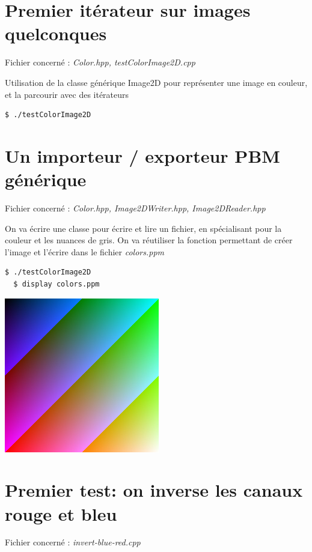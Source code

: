 \documentclass[a4paper,10pt]{article}
\begin{document}
    \section{Premier itérateur sur images quelconques}
    Fichier concerné : \emph{Color.hpp, testColorImage2D.cpp}

     Utilisation de la classe générique Image2D pour représenter une image en couleur, et la parcourir avec des itérateurs
  \begin{lstlisting}[language=Bash]
  $ ./testColorImage2D
  \end{lstlisting}
    \section{Un importeur / exporteur PBM générique}
    Fichier concerné : \emph{Color.hpp, Image2DWriter.hpp, Image2DReader.hpp}

    On va écrire une classe pour écrire et lire un fichier, en spécialisant pour la couleur et les nuances de gris. On va réutiliser la fonction permettant de créer l'image et l'écrire dans le fichier  \emph{colors.ppm}
    \begin{lstlisting}[language=Bash]
  $ ./testColorImage2D
  $ display colors.ppm
  \end{lstlisting}
  \begin{center}
    \includegraphics[scale=0.75]{colors}
    \end{center}
    \pagebreak
    \section{Premier test: on inverse les canaux rouge et bleu}
    Fichier concerné : \emph{invert-blue-red.cpp}
\end{document}
